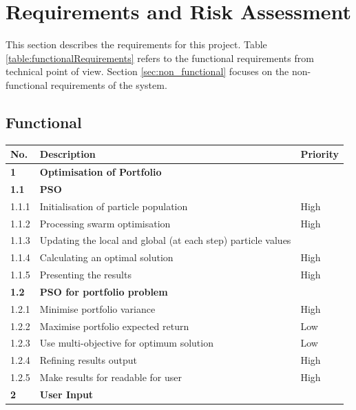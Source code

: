 \documentclass{pdfmx4020}
\begin{document}
  

\chapter{Requirements and Risk Assessment}

This section describes the requirements for this project. Table \ref{table:functionalRequirements} refers to the functional requirements from technical point of view. Section \ref{sec:non_functional} focuses on the non-functional requirements of the system. 
  \section{Functional} %
  \label{sec:functional}
  \begin{table}[ht]
    \setlength{\extrarowheight}{2.0pt}
    \begin{tabular}{|l|l|l|}
      \hline
      No. & Description & Priority \\
      \hline
      \textbf{1} & \textbf{Optimisation of Portfolio} & \\
      \hline 
      \textbf{1.1} & \textbf{PSO} & \\
      \hline 
      1.1.1 & Initialisation of particle population & High \\
      \hline 
      1.1.2 & Processing swarm optimisation & High \\
      \hline 
      1.1.3 & Updating the local and global (at each step) particle values& \\
      \hline 
      1.1.4 & Calculating an optimal solution & High \\
      \hline 
      1.1.5 & Presenting the results & High \\
      \hline 
      \textbf{1.2} & \textbf{PSO for portfolio problem } & \\
      \hline 
      1.2.1 & Minimise portfolio variance & High \\
      \hline 
      1.2.2 & Maximise portfolio expected return & Low \\
      \hline 
      1.2.3 & Use multi-objective for optimum solution & Low \\
      \hline 
      1.2.4 & Refining results output & High \\
      \hline 
      1.2.5 & Make results for readable for user & High \\
      \hline 
      \textbf{2} & \textbf{User Input} & \\
      \hline

\end{tabular}
\end{table}
\end{document}
